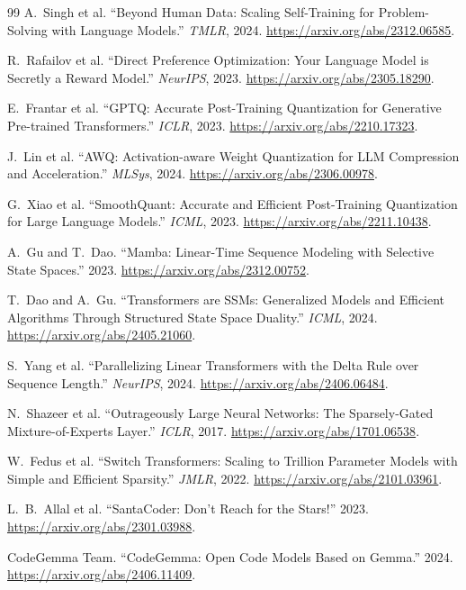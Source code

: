 \documentclass[10pt,letterpaper]{article}
\newcommand{\1}{\mathbb{1}}
\begin{document}
\begin{thebibliography}{99}
A.~Singh et al. ``Beyond Human Data: Scaling Self-Training for Problem-Solving with Language Models.''
\emph{TMLR}, 2024. \url{https://arxiv.org/abs/2312.06585}.

R.~Rafailov et al. ``Direct Preference Optimization: Your Language Model is Secretly a Reward Model.''
\emph{NeurIPS}, 2023. \url{https://arxiv.org/abs/2305.18290}.

E.~Frantar et al. ``GPTQ: Accurate Post-Training Quantization for Generative Pre-trained Transformers.''
\emph{ICLR}, 2023. \url{https://arxiv.org/abs/2210.17323}.

J.~Lin et al. ``AWQ: Activation-aware Weight Quantization for LLM Compression and Acceleration.''
\emph{MLSys}, 2024. \url{https://arxiv.org/abs/2306.00978}.

G.~Xiao et al. ``SmoothQuant: Accurate and Efficient Post-Training Quantization for Large Language
Models.'' \emph{ICML}, 2023. \url{https://arxiv.org/abs/2211.10438}.

A.~Gu and T.~Dao. ``Mamba: Linear-Time Sequence Modeling with Selective State Spaces.'' 2023.
\url{https://arxiv.org/abs/2312.00752}.

T.~Dao and A.~Gu. ``Transformers are SSMs: Generalized Models and Efficient Algorithms Through
Structured State Space Duality.'' \emph{ICML}, 2024.
\url{https://arxiv.org/abs/2405.21060}.

S.~Yang et al. ``Parallelizing Linear Transformers with the Delta Rule over Sequence Length.''
\emph{NeurIPS}, 2024. \url{https://arxiv.org/abs/2406.06484}.

N.~Shazeer et al. ``Outrageously Large Neural Networks: The Sparsely-Gated Mixture-of-Experts Layer.''
\emph{ICLR}, 2017. \url{https://arxiv.org/abs/1701.06538}.

W.~Fedus et al. ``Switch Transformers: Scaling to Trillion Parameter Models with Simple and Efficient
Sparsity.'' \emph{JMLR}, 2022. \url{https://arxiv.org/abs/2101.03961}.

L.~B.~Allal et al. ``SantaCoder: Don't Reach for the Stars!'' 2023.
\url{https://arxiv.org/abs/2301.03988}.

CodeGemma Team. ``CodeGemma: Open Code Models Based on Gemma.'' 2024.
\url{https://arxiv.org/abs/2406.11409}.


\end{thebibliography}
\end{document}
